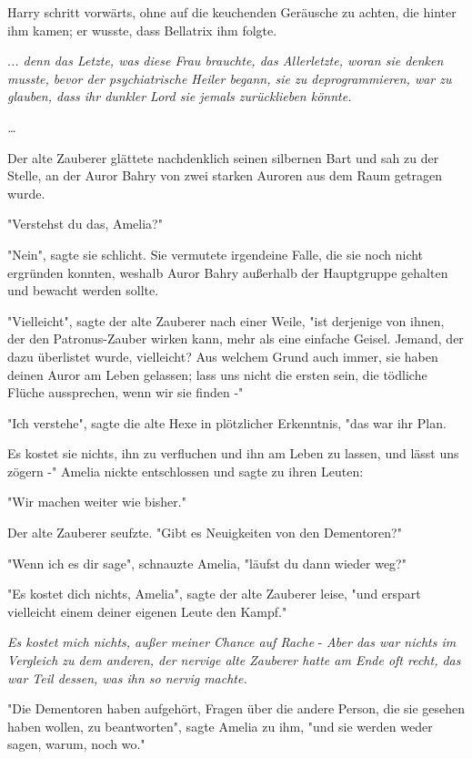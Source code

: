 {Harry schritt vorwärts, ohne auf die keuchenden Geräusche zu achten, die hinter ihm kamen; er wusste, dass Bellatrix ihm folgte.

.\emph{.. denn das Letzte, was diese Frau brauchte, das Allerletzte, woran sie denken musste, bevor der psychiatrische Heiler begann, sie zu deprogrammieren, war zu glauben, dass ihr dunkler Lord sie jemals zurücklieben könnte.}

\emph{…}

Der alte Zauberer glättete nachdenklich seinen silbernen Bart und sah zu der Stelle, an der Auror Bahry von zwei starken Auroren aus dem Raum getragen wurde.

"Verstehst du das, Amelia?"

"Nein", sagte sie schlicht. Sie vermutete irgendeine Falle, die sie noch nicht ergründen konnten, weshalb Auror Bahry außerhalb der Hauptgruppe gehalten und bewacht werden sollte.

"Vielleicht", sagte der alte Zauberer nach einer Weile, "ist derjenige von ihnen, der den Patronus-Zauber wirken kann, mehr als eine einfache Geisel. Jemand, der dazu überlistet wurde, vielleicht? Aus welchem Grund auch immer, sie haben deinen Auror am Leben gelassen; lass uns nicht die ersten sein, die tödliche Flüche aussprechen, wenn wir sie finden -"

"Ich verstehe", sagte die alte Hexe in plötzlicher Erkenntnis, "das war ihr Plan.

Es kostet sie nichts, ihn zu verfluchen und ihn am Leben zu lassen, und lässt uns zögern -" Amelia nickte entschlossen und sagte zu ihren Leuten:

"Wir machen weiter wie bisher."

Der alte Zauberer seufzte. "Gibt es Neuigkeiten von den Dementoren?"

"Wenn ich es dir sage", schnauzte Amelia, "läufst du dann wieder weg?"

"Es kostet dich nichts, Amelia", sagte der alte Zauberer leise, "und erspart vielleicht einem deiner eigenen Leute den Kampf."

\emph{Es kostet mich nichts, außer meiner Chance auf Rache} - \emph{Aber das war nichts im Vergleich zu dem anderen, der nervige alte Zauberer hatte am Ende oft recht, das war Teil dessen, was ihn so nervig machte.}

"Die Dementoren haben aufgehört, Fragen über die andere Person, die sie gesehen haben wollen, zu beantworten", sagte Amelia zu ihm, "und sie werden weder sagen, warum, noch wo."

}
